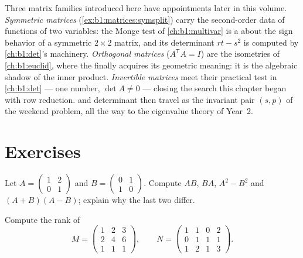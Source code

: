 \begin{remark}
\label{rem:b1:matrices:perspectives}
Three matrix families introduced here have appointments later in
this volume. \emph{Symmetric matrices}
(\cref{ex:b1:matrices:symsplit}) carry the second-order data of
functions of two variables: the Monge test of
\cref{ch:b1:multivar} is a  about the sign behavior of
a symmetric $2\times2$ matrix, and its determinant $rt - s^2$
is computed by \cref{ch:b1:det}'s machinery. \emph{Orthogonal
matrices} ($A^{\mathsf T}A = I$) are the isometries of
\cref{ch:b1:euclid}, where the  finally acquires its
geometric meaning: it is the algebraic shadow of the inner
product. \emph{Invertible matrices} meet their practical test
in \cref{ch:b1:det} --- one number, $\det A \neq 0$ --- closing
the search this chapter began with row reduction.  and
determinant then travel as the invariant pair $(s, p)$ of the
weekend problem, all the way to the eigenvalue theory of
Year~2.
\end{remark}

\section{Exercises}

\begin{exercise}[$\star$]\label{exo:b1:matrices:1}
Let $A = \begin{pmatrix} 1 & 2 \\ 0 & 1 \end{pmatrix}$ and $B =
\begin{pmatrix} 0 & 1 \\ 1 & 0\end{pmatrix}$. Compute $AB$, $BA$,
$A^2 - B^2$ and $(A+B)(A-B)$; explain why the last two differ.
\end{exercise}

\begin{exercise}[$\star$]\label{exo:b1:matrices:2}
Compute the rank of
\[
M = \begin{pmatrix}
1 & 2 & 3\\
2 & 4 & 6\\
1 & 1 & 1
\end{pmatrix},
\qquad
N = \begin{pmatrix}
1 & 1 & 0 & 2\\
0 & 1 & 1 & 1\\
1 & 2 & 1 & 3
\end{pmatrix}.
\]
\end{exercise}

